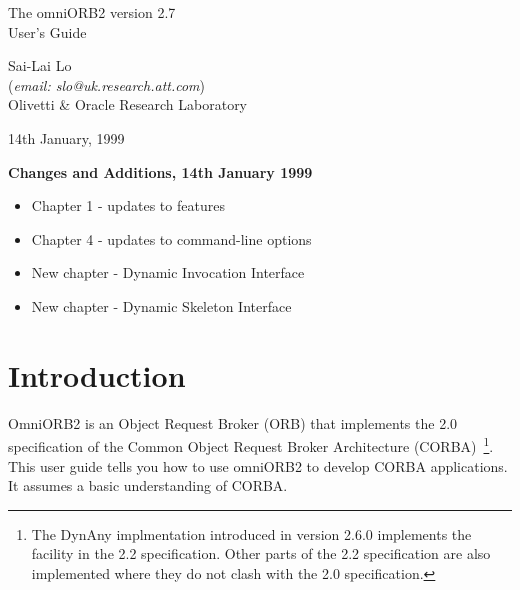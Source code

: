 \documentclass[11pt,twoside,onecolumn]{book}
\begin{document}
\pagestyle{empty}


\begin{center}

\vfill

{ \Huge
The omniORB2 version 2.7\\[4mm]
User's Guide
}

\vfill

{ \Large
Sai-Lai Lo\\
{\normalsize ({\it email: slo@uk.research.att.com})}\\
Olivetti \& Oracle Research Laboratory\\
}


\vfill
\vfill
14th January, 1999
\vfill

\end{center}

\pagebreak

{\Large \bf \sf Changes and Additions, 14th January 1999}

\begin{itemize}
\item Chapter 1 - updates to features
\item Chapter 4 - updates to command-line options
\item New chapter - Dynamic Invocation Interface
\item New chapter - Dynamic Skeleton Interface
\end{itemize}


\cleardoublepage
\tableofcontents
\cleardoublepage
\pagestyle{headings}


\mainmatter

%
\chapter{Introduction}

OmniORB2 is an Object Request Broker (ORB) that implements the 2.0
specification of the Common Object Request Broker Architecture
(CORBA)~\cite{corba2-spec}\footnote{The DynAny implmentation introduced in
version 2.6.0 implements the facility in the 2.2 specification. Other parts
of the 2.2 specification are also implemented where they do not clash
with the 2.0 specification.}.
This user guide tells you how to use omniORB2 to develop CORBA applications.
It assumes a basic understanding of CORBA. 
\end{document}
